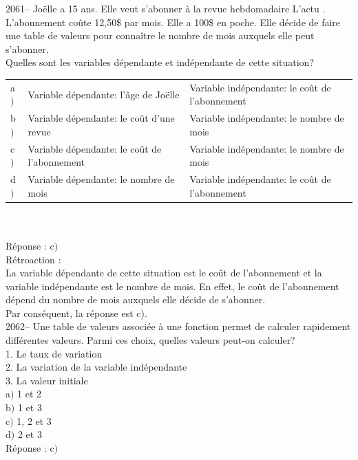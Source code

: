 \documentclass[letterpaper, 12pt]{article}
\begin{document}
2061-- Jo\"{e}lle a 15 ans. Elle veut s'abonner \`a la revue hebdomadaire \og L'actu \fg. L'abonnement co\^ute 12,50\$ par mois. Elle a 100\$ en poche. Elle d\'ecide de faire une table de valeurs pour conna\^itre le nombre de mois auxquels elle peut s'abonner. \\
Quelles sont les variables d\'ependante et ind\'ependante de cette situation?\\

\begin{tabular}{l l l}
a$)$ & Variable d\'ependante: l'\^age de Jo\"{e}lle & Variable ind\'ependante: le co\^ut de l'abonnement\\
b$)$ & Variable d\'ependante: le co\^ut d'une revue & Variable ind\'ependante: le nombre de mois\\
c$)$ & Variable d\'ependante: le co\^ut de l'abonnement & Variable ind\'ependante: le nombre de mois\\
d$)$ & Variable d\'ependante: le nombre de mois & Variable ind\'ependante: le co\^ut de l'abonnement\\
\end{tabular}\\
\\
R\'eponse : c$)$ \\

R\'etroaction :\\
La variable d\'ependante de cette situation est le co\^ut de l'abonnement et la variable ind\'ependante est le nombre de mois. En effet, le co\^ut de l'abonnement d\'epend du nombre de mois auxquels elle d\'ecide de s'abonner.\\
Par cons\'equent, la r\'eponse est c).\\

2062-- Une table de valeurs associ\'ee \`a une fonction permet de calculer rapidement diff\'erentes valeurs. Parmi ces choix, quelles valeurs peut-on calculer?\\

1. Le taux de variation\\
2. La variation de la variable ind\'ependante\\
3. La valeur initiale\\

a$)$  1 et 2\\
b$)$  1 et 3\\
c$)$  1, 2 et 3\\
d$)$  2 et 3\\

R\'eponse : c$)$\\
\end{document}

